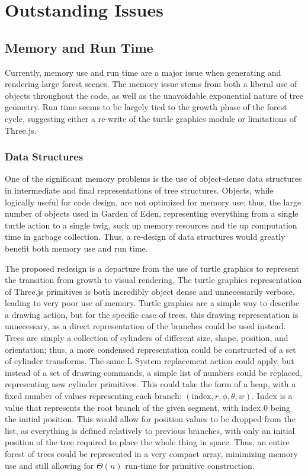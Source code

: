 \documentclass{article}
\newcommand{\tab}{\hspace*{2em}}
\begin{document}
    \section{Outstanding Issues}
        \subsection{Memory and Run Time}
    \tab Currently, memory use and run time are a major issue when generating and rendering large
forest scenes. The memory issue stems from both a liberal use of objects throughout the code, as
well as the unavoidable exponential nature of tree geometry. Run time seems to be largely
tied to the growth phase of the forest cycle, suggesting either a re-write of the turtle graphics
module or limitations of Three.js.

            \subsubsection{Data Structures}
    \tab One of the significant memory problems is the use of object-dense data structures
in intermediate and final representations of tree structures. Objects, while logically useful for
code design, are not optimized for memory use; thus, the large number of objects used in Garden of
Eden, representing everything from a single turtle action to a single twig, suck up memory
resources and tie up computation time in garbage collection. Thus, a re-design of data structures
would greatly benefit both memory use and run time.

    \tab The proposed redesign is a departure from the use of turtle graphics to represent
the transition from growth to visual rendering. The turtle graphics representation of Three.js
primitives is both incredibly object dense and unnecessarily verbose, leading to very poor use of
memory. Turtle graphics are a simple way to describe a drawing action, but for the specific case
of trees, this drawing representation is unnecessary, as a direct representation of the branches could be
used instead. Trees are simply a collection of cylinders of
different size, shape, position, and orientation; thus, a more condensed representation could be
constructed of a set of cylinder transforms. The same L-System replacement action could apply, but
instead of a set of drawing commands, a simple list of numbers could be replaced, representing
new cylinder primitives. This could take the form of a heap, with a fixed number of values
representing each branch: $(\text{index}, r, \phi, \theta, w)$. Index is a value that represents
the root branch of the given segment, with index 0 being the initial position. This would allow for
position values to be dropped from the list, as everything is defined relatively to previous
branches, with only an initial position of the tree required to place the whole thing in space.
Thus, an entire forest of trees could be represented in a very compact array, minimizing memory use
and still allowing for $\Theta(n)$ run-time for primitive construction.
\end{document}
